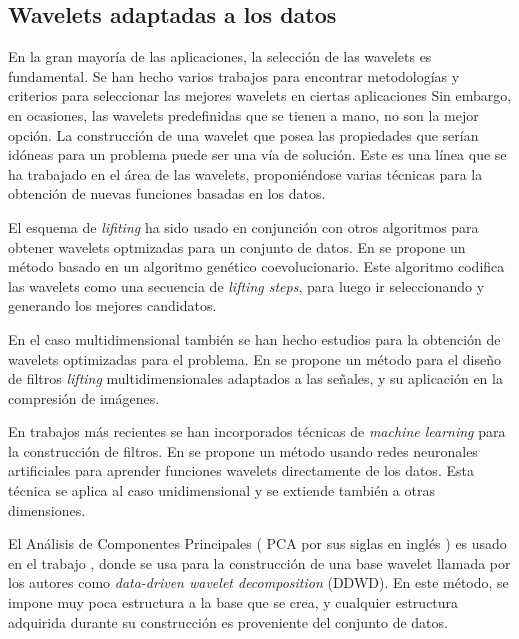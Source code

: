 \subsection{Wavelets adaptadas a los datos}\label{adapted-wavelets}

En la gran mayoría de las aplicaciones, la selección de las wavelets es fundamental. Se han hecho varios trabajos
para encontrar metodologías y criterios para seleccionar las mejores wavelets en ciertas aplicaciones \cite{ngui2013} \cite{doi:10.1177/14759217211010261} 
Sin embargo, en ocasiones, las wavelets predefinidas que se tienen a mano, no son la mejor opción.
La construcción de una wavelet que posea las propiedades que serían idóneas para un problema puede ser una
vía de solución. Este es una línea que se ha trabajado en el área de las wavelets, proponiéndose varias
técnicas para la obtención de nuevas funciones basadas en los datos.

El esquema de \textit{lifiting} ha sido usado en conjunción con otros algoritmos para obtener wavelets optmizadas para un conjunto de datos.
En \cite{Grasemann2004} se propone un método basado en un algoritmo genético coevolucionario. Este algoritmo codifica las wavelets
como una secuencia de \textit{lifting steps}, para luego ir seleccionando y generando los mejores 
candidatos.

En el caso multidimensional también se han hecho estudios para la obtención de wavelets optimizadas para el problema.
En \cite{Gouze2004} se propone un método para el diseño de filtros \textit{lifting} multidimensionales adaptados a las señales, y  
su aplicación en la compresión de imágenes.

En trabajos más recientes se han incorporados técnicas de \textit{machine learning} para la construcción de filtros.
En \cite{Recoskie2018LearningSO} se propone un método usando redes neuronales artificiales para aprender funciones 
wavelets directamente de los datos. Esta técnica se aplica al caso unidimensional y se extiende también a otras 
dimensiones.

El Análisis de Componentes Principales ( PCA por sus siglas en inglés ) es usado en el trabajo \cite{floryan}, donde
se usa para la construcción de una base wavelet llamada por los autores como \textit{ data-driven wavelet decomposition } 
(DDWD). En este método, se impone muy poca estructura a la base que se crea, y cualquier estructura adquirida durante su construcción
es proveniente del conjunto de datos.

